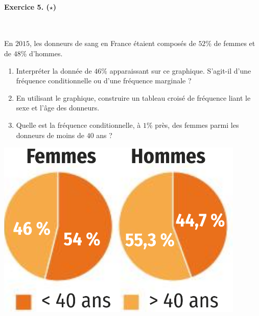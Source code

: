 \documentclass[11pt]{article}
\begin{document}
\paragraph{Exercice 5. ($\star$)}~\\
\begin{minipage}[]{.5\textwidth}
  En $2015$, les donneurs de sang en France étaient composés de $52$\% de femmes
  et de $48$\% d'hommes.
  \begin{enumerate}
    \item Interpréter la donnée de $46$\% apparaissant sur ce graphique.
      S'agit-il d'une fréquence conditionnelle ou d'une fréquence marginale ?
    \item En utilisant le graphique, construire un tableau croisé de fréquence
      liant le sexe et l'\^age des donneurs.
    \item Quelle est la fréquence conditionnelle, à $1$\% près, des femmes parmi
      les donneurs de moins de $40$ ans ?
  \end{enumerate}
\end{minipage}
\begin{minipage}[]{.5\textwidth}
  \begin{center}
    \includegraphics[scale=.5]{hf.png}
  \end{center}
\end{minipage}
\end{document}
